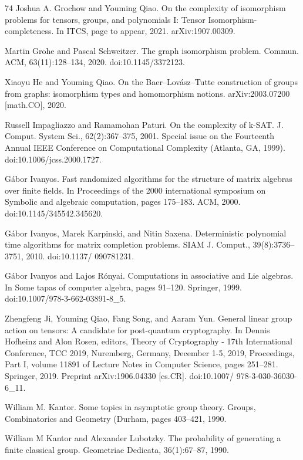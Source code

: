 \documentclass[10pt,a4paper]{article}
\begin{document}
\begin{thebibliography}{74}
Joshua A. Grochow and Youming Qiao. On the complexity of isomorphism problems for tensors, groups, and polynomials I: Tensor Isomorphism-completeness. In ITCS, page to appear, 2021. arXiv:1907.00309.

Martin Grohe and Pascal Schweitzer. The graph isomorphism problem. Commun. ACM, 63(11):128–134, 2020. doi:10.1145/3372123.

Xiaoyu He and Youming Qiao. On the Baer–Lovász–Tutte construction of groups from graphs: isomorphism types and homomorphism notions. arXiv:2003.07200 [math.CO], 2020.

Russell Impagliazzo and Ramamohan Paturi. On the complexity of k-SAT. J. Comput. System Sci., 62(2):367–375, 2001. Special issue on the Fourteenth Annual IEEE Conference on Computational Complexity (Atlanta, GA, 1999). doi:10.1006/jcss.2000.1727.

Gábor Ivanyos. Fast randomized algorithms for the structure of matrix algebras over finite fields. In Proceedings of the 2000 international symposium on Symbolic and algebraic computation, pages 175–183. ACM, 2000. doi:10.1145/345542.345620.

Gábor Ivanyos, Marek Karpinski, and Nitin Saxena. Deterministic polynomial time algorithms for matrix completion problems. SIAM J. Comput., 39(8):3736–3751, 2010. doi:10.1137/ 090781231.

Gábor Ivanyos and Lajos Rónyai. Computations in associative and Lie algebras. In Some tapas of computer algebra, pages 91–120. Springer, 1999. doi:10.1007/978-3-662-03891-8\_5.

Zhengfeng Ji, Youming Qiao, Fang Song, and Aaram Yun. General linear group action on tensors: A candidate for post-quantum cryptography. In Dennis Hofheinz and Alon Rosen, editors, Theory of Cryptography - 17th International Conference, TCC 2019, Nuremberg, Germany, December 1-5, 2019, Proceedings, Part I, volume 11891 of Lecture Notes in Computer Science, pages 251–281. Springer, 2019. Preprint arXiv:1906.04330 [cs.CR]. doi:10.1007/ 978-3-030-36030-6\_11.

William M. Kantor. Some topics in asymptotic group theory. Groups, Combinatorics and Geometry (Durham, pages 403–421, 1990.

William M Kantor and Alexander Lubotzky. The probability of generating a finite classical group. Geometriae Dedicata, 36(1):67–87, 1990.


\end{thebibliography}
\end{document}
